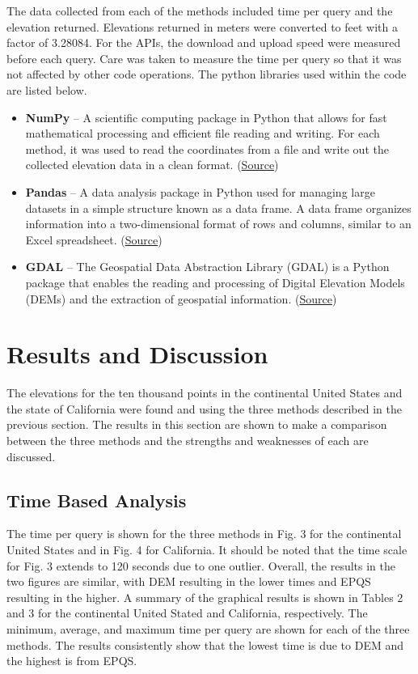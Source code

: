 \documentclass[conf]{new-aiaa}
\begin{document}
The data collected from each of the methods included time per query and the elevation returned. Elevations returned in meters were converted to feet with a factor of 3.28084. For the APIs, the download and upload speed were measured before each query. Care was taken to measure the time per query so that it was not affected by other code operations. The python libraries used within the code are listed below. 

\begin{itemize} \item \textbf{NumPy} – A scientific computing package in Python that allows for fast mathematical processing and efficient file reading and writing. For each method, it was used to read the coordinates from a file and write out the collected elevation data in a clean format. (\href{https://numpy.org/doc/stable/}{Source}) 

\item \textbf{Pandas} – A data analysis package in Python used for managing large datasets in a simple structure known as a data frame. A data frame organizes information into a two-dimensional format of rows and columns, similar to an Excel spreadsheet.  (\href{https://pandas.pydata.org/}{Source}) 

\item \textbf{GDAL} – The Geospatial Data Abstraction Library (GDAL) is a Python package that enables the reading and processing of Digital Elevation Models (DEMs) and the extraction of geospatial information.  (\href{https://gdal.org/}{Source}) \end{itemize}

\section{Results and Discussion}

The elevations for the ten thousand points in the continental United States and the state of California were found and using the three methods described in the previous section. The results in this section are shown to make a comparison between the three methods and the strengths and weaknesses of each are discussed.

\subsection{Time Based Analysis}

The time per query is shown for the three methods in Fig. 3 for the continental United States and in Fig. 4 for California.  It should be noted that the time scale for Fig. 3 extends to 120 seconds due to one outlier.  Overall, the results in the two figures are similar, with DEM resulting in the lower times and EPQS resulting in the higher.
A summary of the graphical results is shown in Tables 2 and 3 for the continental United Stated and California, respectively.  The minimum, average, and maximum time per query are shown for each of the three methods.  The results consistently show that the lowest time is due to DEM and the highest is from EPQS.
\end{document}
